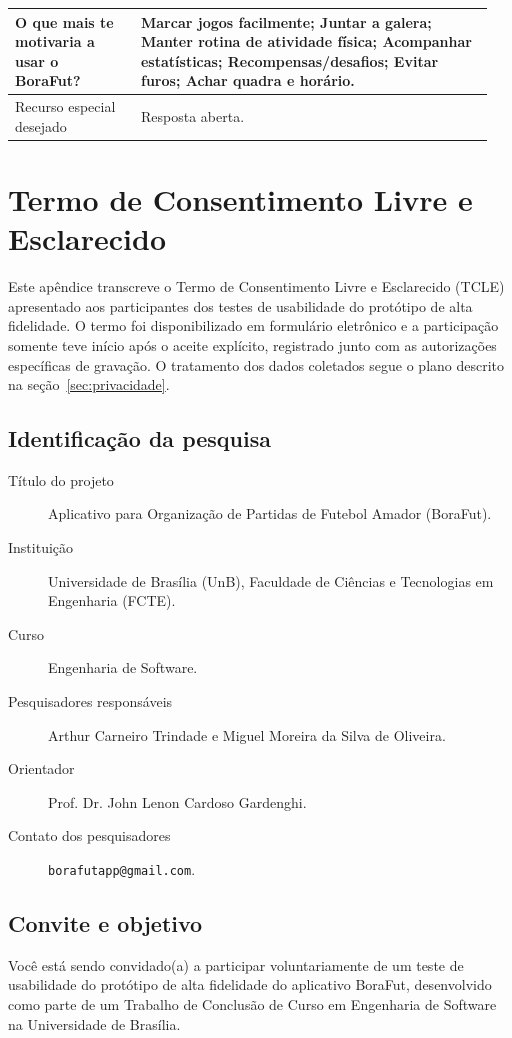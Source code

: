 \begin{apendicesenv}
\begin{longtable}{p{0.25\linewidth} p{0.70\linewidth}}
        O que mais te motivaria a usar o BoraFut? &
        Marcar jogos facilmente; Juntar a galera; Manter rotina de atividade física; Acompanhar estatísticas; Recompensas/desafios; Evitar furos; Achar quadra e horário. \\
        \hline

        Recurso especial desejado &
        Resposta aberta. \\
        \hline
    \end{longtable}

\chapter{Termo de Consentimento Livre e Esclarecido}
    \label{apendice:tcle}

    Este apêndice transcreve o Termo de Consentimento Livre e Esclarecido (TCLE) apresentado aos participantes dos testes de usabilidade do protótipo de alta fidelidade. O termo foi disponibilizado em formulário eletrônico e a participação somente teve início após o aceite explícito, registrado junto com as autorizações específicas de gravação. O tratamento dos dados coletados segue o plano descrito na seção~\ref{sec:privacidade}.

    \section*{Identificação da pesquisa}
        \begin{description}
            \item[Título do projeto] Aplicativo para Organização de Partidas de Futebol Amador (BoraFut).
            \item[Instituição] Universidade de Brasília (UnB), Faculdade de Ciências e Tecnologias em Engenharia (FCTE).
            \item[Curso] Engenharia de Software.
            \item[Pesquisadores responsáveis] Arthur Carneiro Trindade e Miguel Moreira da Silva de Oliveira.
            \item[Orientador] Prof. Dr. John Lenon Cardoso Gardenghi.
            \item[Contato dos pesquisadores] \texttt{borafutapp@gmail.com}.
        \end{description}

    \section*{Convite e objetivo}
        Você está sendo convidado(a) a participar voluntariamente de um teste de usabilidade do protótipo de alta fidelidade do aplicativo BoraFut, desenvolvido como parte de um Trabalho de Conclusão de Curso em Engenharia de Software na Universidade de Brasília.


\end{apendicesenv}
